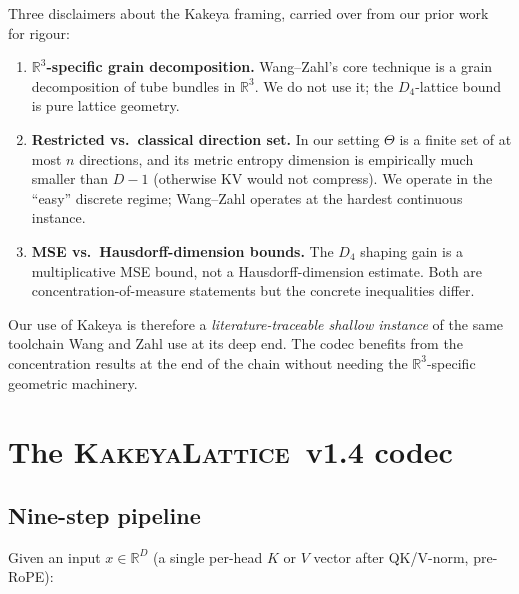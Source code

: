 \documentclass[11pt,a4paper]{article}
\theoremstyle{definition}
\theoremstyle{plain}
\newcommand{\R}{\mathbb{R}}
\begin{document}
Three disclaimers about the Kakeya framing, carried over from our
prior work~\cite{kakeya-v13-paper} for rigour:

\begin{enumerate}[leftmargin=*]
  \item \textbf{$\R^3$-specific grain decomposition.} Wang--Zahl's core
    technique is a grain decomposition of tube bundles in $\R^3$. We
    do not use it; the $D_4$-lattice bound is pure lattice geometry.
  \item \textbf{Restricted vs.\ classical direction set.} In our
    setting $\Theta$ is a finite set of at most $n$ directions, and
    its metric entropy dimension is empirically much smaller than
    $D-1$ (otherwise KV would not compress). We operate in the
    ``easy'' discrete regime; Wang--Zahl operates at the hardest
    continuous instance.
  \item \textbf{MSE vs.\ Hausdorff-dimension bounds.} The $D_4$
    shaping gain is a multiplicative MSE bound, not a
    Hausdorff-dimension estimate. Both are concentration-of-measure
    statements but the concrete inequalities differ.
\end{enumerate}

Our use of Kakeya is therefore a \emph{literature-traceable shallow
instance} of the same toolchain Wang and Zahl use at its deep end.
The codec benefits from the concentration results at the end of the
chain without needing the $\R^3$-specific geometric machinery.

\section{The \textsc{KakeyaLattice}~v1.4 codec}
\label{sec:codec}

\subsection{Nine-step pipeline}

Given an input $x \in \R^D$ (a single per-head $K$ or $V$ vector
after QK/V-norm, pre-RoPE):
\end{document}
